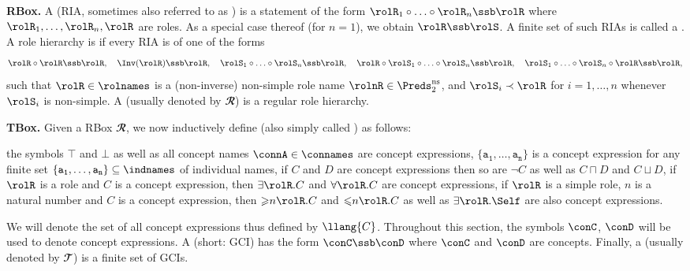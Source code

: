 \documentclass[10pt,a4paper]{amsart}
\theoremstyle{definition}
\numberwithin{equation}{section}
\theoremstyle{plain}
\theoremstyle{definition}
\theoremstyle{myexample}
\theoremstyle{plain}
\theoremstyle{definition}
\begin{document}
\medskip\noindent\textbf{RBox. } 
%
A  (RIA, sometimes also referred to as
) is a statement of the form $\rolR_1 \circ
\ldots \circ \rolR_n \ssb \rolR$ where $\rolR_1,\ldots,\rolR_n,\rolR$ are roles. As a special case thereof (for $n=1$), we obtain  $\rolR \ssb \rolS$. A finite set of such RIAs is called a .
%
%
A role hierarchy is  if every RIA is of one of the forms
$$\rolR\circ\rolR\ssb \rolR,\quad
\Inv(\rolR) \ssb \rolR, \quad
\rolS_1\circ\ldots\circ\rolS_n\ssb \rolR, \quad
\rolR\circ\rolS_1\circ\ldots\circ\rolS_n\ssb \rolR, \quad
\rolS_1\circ\ldots\circ\rolS_n\circ\rolR\ssb \rolR,$$%
such that $\rolR\in\rolnames$ is a (non-inverse) non-simple role name $\rolnR \in \Preds^\mathrm{ns}_2$, and $\rolS_i\prec\rolR$ for $i=1, \ldots, n$ whenever $\rolS_i$ is non-simple.
%
A \SROIQ{}
 (usually denoted by $\mathbfcal{R}$) is %
a regular role hierarchy.

\medskip\noindent\textbf{TBox. } 
%
Given a \SROIQ{} RBox $\mathbfcal{R}$, we now inductively define  (also simply called ) as follows:
\begin{itemize}
\itemb
the symbols $\top$ and $\bot$ as well as all concept names $\connA\in \connames$ are concept expressions,
\itemb
$\{\mathtt{a_1}, \ldots, \mathtt{a_n}\}$ is a concept expression for any finite set $\{\mathtt{a_1}, \ldots, \mathtt{a_n}\}\subseteq \indnames$ of individual names,
\itemb
if $C$ and $D$ are concept expressions then so are $\neg C$ as well as $C\sqcap D$ and $C\sqcup D$,
\itemb
if $\rolR$ is a role and $C$ is a concept expression, then $\exists \rolR. C$ and $\forall \rolR. C$ are concept expressions,
\itemb
if $\rolR$ is a simple role, $n$ is a natural number and $C$ is a concept expression, then  ${\geqslant}n\rolR. C$ and ${\leqslant}n\rolR. C$ as well as $\exists\rolR.\Self$ are also concept expressions.
\end{itemize}
We will denote the set of all concept expressions thus defined by $ \llang{C}$. Throughout this section, the symbols $\conC$, $\conD$ will be used to denote concept expressions.
%
A  (short: GCI) has the form $\conC \ssb \conD$ where $\conC$ and $\conD$ are concepts.
%
Finally, a \SROIQ{}  (usually denoted by $\mathbfcal{T}$) is a finite set of GCIs.
\end{document}
